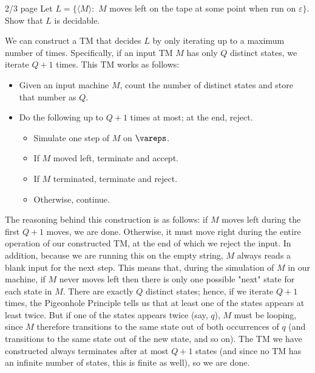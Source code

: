 \documentclass[solution, letterpaper]{cs121}
\begin{document}
 {2/3 page}
Let $L=\{\langle M\rangle:$ $M$ moves left on the tape at some point when run on $\varepsilon\}$. Show that $L$ is decidable.

\begin{solution}
We can construct a TM that decides $L$ by only iterating up to a maximum number of times.  Specifically, if an input TM $M$ has only $Q$ distinct states, we iterate $Q+1$ times.  This TM works as follows:
\begin{itemize}
	\setlength\itemsep{0cm}
	\item Given an input machine $M$, count the number of distinct states and store that number as $Q$.
	\item Do the following up to $Q+1$ times at most; at the end, reject.
	\begin{itemize}
		\item Simulate one step of $M$ on $\vareps$.
		\item If $M$ moved left, terminate and accept.
		\item If $M$ terminated, terminate and reject.
		\item Otherwise, continue.
	\end{itemize}
\end{itemize}

The reasoning behind this construction is as follows: if $M$ moves left during the first $Q+1$ moves, we are done.  Otherwise, it must move right during the entire operation of our constructed TM, at the end of which we reject the input.  In addition, because we are running this on the empty string, $M$ always reads a blank input for the next step.  This means that, during the simulation of $M$ in our machine, if $M$ never moves left then there is only one possible "next" state for each state in $M$.  There are exactly $Q$ distinct states; hence, if we iterate $Q+1$ times, the Pigeonhole Principle tells us that at least one of the states appears at least twice.  But if one of the states appears twice (say, $q$), $M$ must be looping, since $M$ therefore transitions to the same state out of both occurrences of $q$ (and transitions to the same state out of the new state, and so on).  The TM we have constructed always terminates after at most $Q+1$ states (and since no TM has an infinite number of states, this is finite as well), so we are done.
\end{solution}
\end{document}
